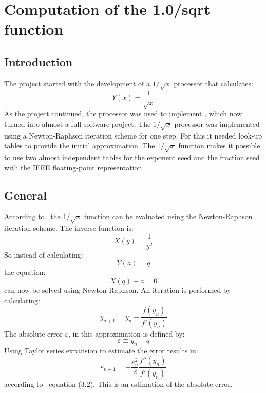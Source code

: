 \section{Computation of the 1.0/sqrt function}
\label{sec:sqrt}
\subsection{Introduction}
The {\gromacs} project started with the development of a $1/\sqrt{x}$
processor that calculates:
\begin{equation}
Y(x) = \frac{1}{ \sqrt{x} }
\end{equation}
As the project continued, the {\intel} processor was used to implement
{\gromacs}, which now turned into almost a full software project.  The
$1/\sqrt{x}$ processor was implemented using a Newton-Raphson
iteration scheme for one step. For this it needed look-up tables to
provide the initial approximation. The $1/\sqrt{x}$ function makes it
possible to use two almost independent tables for the exponent seed
and the fraction seed with the IEEE floating-point representation.

\subsection{General}
According to~\cite{Bekker87} the $1/\sqrt{x}$ function can be evaluated using
the Newton-Raphson iteration scheme. The inverse function is:
\begin{equation}
X(y) = \frac{1}{y^{2}}
\end{equation}
So instead of calculating:
\begin{equation}
Y(a) = q
\end{equation}
the equation:
\begin{equation}
X(q) - a = 0
\label{eqn:inversef}
\end{equation}
can now be solved using Newton-Raphson. An iteration is performed by
calculating:
\begin{equation}
y_{n+1} = y_{n} - \frac{f(y_{n})}{f'(y_{n})}
\label{eqn:nr}
\end{equation}
The absolute error $\varepsilon$, in this approximation is defined by:
\begin{equation}
\varepsilon \equiv y_{n} - q
\end{equation}
Using Taylor series expansion to estimate the error results in:
\begin{equation}
\varepsilon _{n+1} = - \frac{\varepsilon _{n}^{2}}{2}
                       \frac{ f''(y_{n})}{f'(y_{n})}
\label{eqn:taylor}
\end{equation}
according to~\cite{Bekker87} equation (3.2). This is an estimation of the
absolute error.

